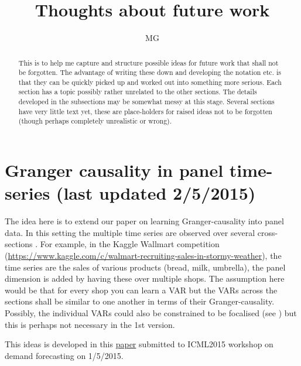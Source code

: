 \documentclass[a4paper]{article}
\newif\ifShowComments
\newcommand{\note}[1]{\ifShowComments {\color{blue}\emph{Note: #1}} \else {} \fi}
\begin{document}
\title{Thoughts about future work}
\author{MG}
\maketitle

\setlength{\parindent}{0pt}
\setlength{\parskip}{1ex plus 0.5ex minus 0.2ex}

\begin{abstract}
This is to help me capture and structure possible ideas for future work that shall not be forgotten. The advantage of writing these down and developing the notation etc. is that they can be quickly picked up and worked out into something more serious. Each section has a topic possibly rather unrelated to the other sections. The details developed in the subsections may be somewhat messy at this stage. Several sections have very little text yet, these are place-holders for raised ideas not to be forgotten (though perhaps completely unrealistic or wrong).
\end{abstract}

\tableofcontents

\section{Granger causality in panel time-series (last updated 2/5/2015)}\label{sec:GrangerInPanels}

The idea here is to extend our paper on learning Granger-causality \cite{Gregorova2015} into panel data.
In this setting the multiple time series are observed over several \note{independent?} cross-sections \note{is this the right term?}.
For example, in the Kaggle Wallmart competition (\url{https://www.kaggle.com/c/walmart-recruiting-sales-in-stormy-weather}), the time series are the sales of various products (bread, milk, umbrella), the panel dimension is added by having these over multiple shops.
The assumption here would be that for every shop you can learn a VAR but the VARs across the sections shall be similar to one another in terms of their Granger-causality.
Possibly, the individual VARs could also be constrained to be focalised (see \cite{Gregorova2015}) but this is perhaps not necessary in the 1st version. 

This ideas is developed in this \href{http://www.gail.unige.ch/mediawiki/index.php/File:PanelVAR_ICML2015WS_v02.pdf}{paper} submitted to ICML2015 workshop on demand forecasting on 1/5/2015.
\end{document}
